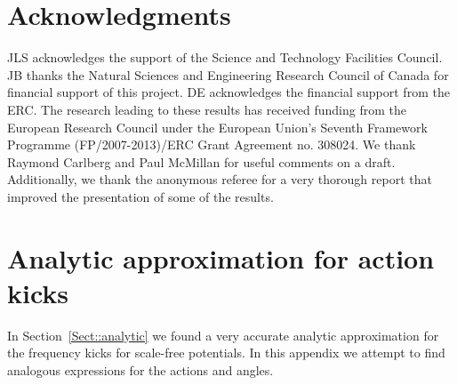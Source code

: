 \documentclass[useAMS,usenatbib,fleqn,a4paper]{mn2e}
\begin{document}
\section*{Acknowledgments}
JLS acknowledges the support of the Science and Technology Facilities
Council. JB thanks the Natural Sciences and Engineering Research
Council of Canada for financial support of this project. DE acknowledges the financial support from the ERC. The research leading to these
results has received funding from the European Research Council under
the European Union's Seventh Framework Programme (FP/2007-2013)/ERC
Grant Agreement no. 308024. We thank Raymond Carlberg and Paul McMillan for useful comments on a draft. Additionally, we thank the anonymous referee for a very thorough report that improved the presentation of some of the results.




\appendix

\section{Analytic approximation for action kicks}\label{Appendix::Analytic}
In Section~\ref{Sect::analytic} we found a very accurate analytic approximation for the frequency kicks for scale-free potentials. In this appendix we attempt to find analogous expressions for the actions and angles.
\end{document}
